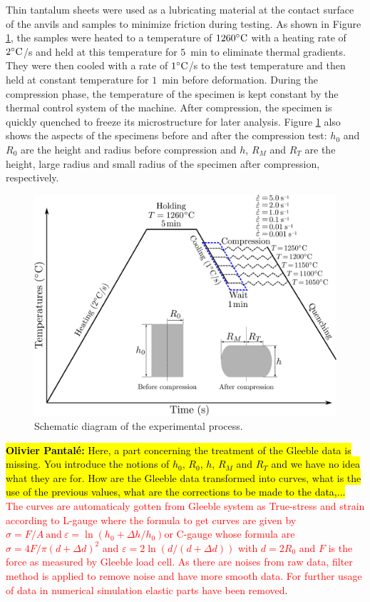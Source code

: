 \documentclass[twoside,english,1p,final,sort&compress]{elsarticle}
\theoremstyle{plain}
\DeclareRobustCommand{\OP}[1]{ {\begingroup\sethlcolor{VWyellow}\textcolor{red}{\hl{\textbf{Olivier Pantal\'e:} #1}}\endgroup} }
\begin{document}
Thin tantalum sheets were used as a lubricating material at the contact surface of the anvils and samples to minimize friction during testing.
As shown in Figure \ref{fig:GleebleProcess}, the samples were heated to a temperature of $1260\celsius$ with a heating rate of $2\celsius$/s and held at this temperature for $5$~min to eliminate thermal gradients.
They were then cooled with a rate of $1\celsius$/s to the test temperature and then held at constant temperature for $1$~min before deformation.
During the compression phase, the temperature of the specimen is kept constant by the thermal control system of the machine.
After compression, the specimen is quickly quenched to freeze its microstructure for later analysis.
Figure \ref{fig:GleebleProcess} also shows the aspects of the specimens before and after the compression test: $h_0$ and $R_0$ are the height and radius before compression and $h$, $R_M$ and $R_T$ are the height, large radius and small radius of the specimen after compression, respectively.
\begin{figure}[!ht]
\centering
\includegraphics[width=0.8\columnwidth]{Figures/GleebleProcess}
\caption{Schematic diagram of the experimental process.}
\label{fig:GleebleProcess}
\end{figure}

\OP{Here, a part concerning the treatment of the Gleeble data is missing.
You introduce the notions of $h_0$, $R_0$, $h$, $R_M$ and $R_T$ and we have no idea what they are for.
How are the Gleeble data transformed into curves, what is the use of the previous values, what are the corrections to be made to the data,...}\textcolor{red}{The curves are automaticaly gotten from Gleeble system as True-stress and strain according to L-gauge where the formula to get curves are given by $\sigma =F/A\ \text{and}\ \varepsilon = \ln\left(h_0 +\Delta h / h_0\right) $or C-gauge whose formula are $\sigma = 4F/\pi(d+\Delta d)^2$ and $\varepsilon = 2\ln(d/(d+\Delta d))$ with $d = 2R_0$ and $F$ is the force as measured by Gleeble load cell.
As there are noises from raw data, filter method is applied to remove noise and have more smooth data.
For further usage of  data in numerical simulation elastic parts have been removed}.
\end{document}
